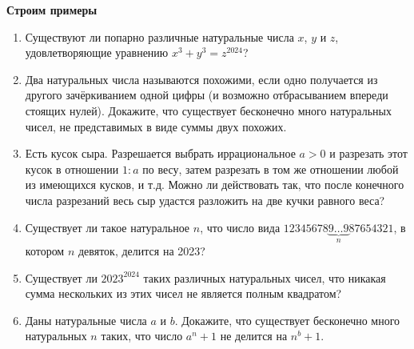 \documentclass{article}
\begin{document}
\large
	

\begin{center}
\textbf{Строим примеры}
\end{center}

\begin{enumerate}[label*=\protect\fbox{\arabic{enumi}}]
	
	\item  Существуют ли попарно различные натуральные числа $x$, $y$ и $z$, удовлетворяющие
	уравнению $x^3 + y^3 =z^{2024}$?
	
	\item Два натуральных числа называются похожими, если одно получается из другого зачёркиванием одной цифры (и возможно отбрасыванием впереди стоящих нулей). Докажите, что существует бесконечно много натуральных чисел, не представимых в виде суммы двух похожих.
	
	\item Есть кусок сыра. Разрешается выбрать иррациональное $a > 0$ и разрезать этот кусок в отношении $1 : a$ по весу, затем разрезать в том же отношении любой из имеющихся кусков, и т.д. Можно ли действовать так, что после конечного числа разрезаний весь сыр удастся разложить на две кучки равного веса?
	
	\item Существует ли такое натуральное $n$, что число вида $12345678\underbrace{9\dotsc9}_{n}87654321$, в котором $n$ девяток, делится на 2023?
	
	\item Существует ли $2023^{2024}$ таких различных натуральных чисел, что никакая сумма нескольких из этих чисел не является полным квадратом?
	
	\item Даны натуральные числа $a$ и $b$. Докажите, что существует бесконечно много натуральных $n$ таких, что число $a^n + 1$ не делится на $n^b + 1$.

\end{enumerate}
\end{document}

